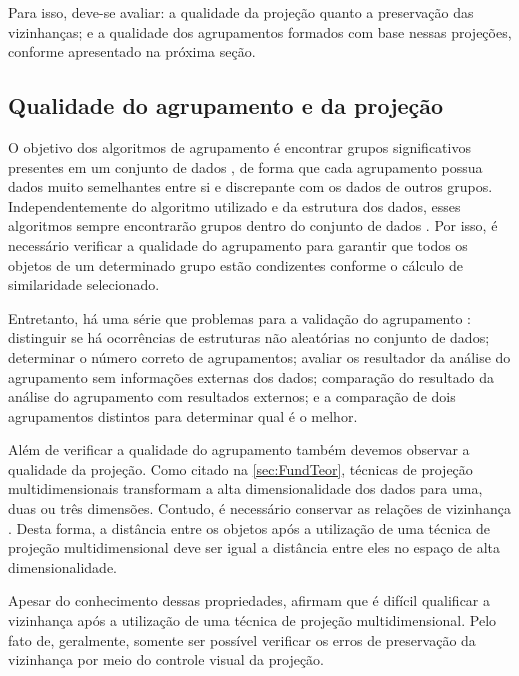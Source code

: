			Para isso, deve-se avaliar: a qualidade da projeção quanto %
			a preservação das vizinhanças; e a qualidade dos agrupamentos formados com base
			nessas projeções, conforme apresentado na próxima seção.
						
		\subsection{Qualidade do agrupamento e da projeção}
		\label{subsec:qualidade}
			O objetivo dos algoritmos de agrupamento é encontrar grupos significativos
			presentes em um conjunto de dados \cite{Halkidi2001}, de forma que cada agrupamento
			possua dados muito semelhantes entre si e discrepante com os dados de outros grupos.
			Independentemente do algoritmo utilizado e da estrutura dos dados,
			esses algoritmos sempre encontrarão grupos dentro do conjunto de dados
			\cite{Tan:2005:ch8}. Por isso, é necessário verificar a qualidade do
			agrupamento para garantir que todos os objetos de um determinado grupo
			estão condizentes conforme o cálculo de similaridade selecionado.
			
			Entretanto, há uma série que problemas para a validação do agrupamento
			\cite{Tan:2005:ch8}: distinguir se há ocorrências de estruturas não aleatórias
			no conjunto de dados; determinar o número correto de agrupamentos; avaliar
			os resultador da análise do agrupamento sem informações externas dos dados;
			comparação do resultado da análise do agrupamento com resultados externos;
			e a comparação de dois agrupamentos distintos para determinar qual é o melhor.
			
			Além de verificar a qualidade do agrupamento também devemos observar a
			qualidade da projeção. Como citado na \cref{sec:FundTeor}, técnicas de projeção
			multidimensionais transformam a alta dimensionalidade dos dados para uma, duas
			ou três dimensões. Contudo, é necessário conservar as relações de vizinhança
			\cite{bauer1992quantifying}. Desta forma, a distância entre os objetos após a
			utilização de uma técnica de projeção multidimensional deve ser igual a distância
			entre eles no espaço de alta dimensionalidade.
			
			Apesar do conhecimento dessas propriedades, 
			afirmam que é difícil qualificar a vizinhança após a utilização de uma técnica
			de projeção multidimensional. Pelo fato de, geralmente, somente ser possível
			verificar os erros de preservação da vizinhança por meio do controle visual
			da projeção.
			
